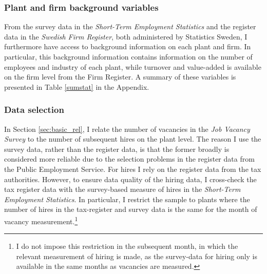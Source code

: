\subsubsection{Plant and firm background variables}

From the survey data in the \emph{Short-Term Employment Statistics} and the register data in the \emph{Swedish Firm Register}, both administered by Statistics Sweden, I furthermore have access to background information on each plant and firm. In particular, this background information contains information on the number of employees and industry of each plant, while turnover and value-added is available on the firm level from the Firm Register. A summary of these variables is presented in Table \ref{sumstat} in the Appendix. 

\subsubsection{Data selection}


In Section \ref{sec:basic_rel}, I relate the number of vacancies in the \textit{Job Vacancy Survey} to the number of subsequent hires on the plant level. The reason I use the survey data, rather than the register data, is that the former broadly is considered more reliable due to the selection problems in the register data from the Public Employment Service. For hires I rely on the register data from the tax authorities. However, to ensure data quality of the hiring data, I cross-check the tax register data with the survey-based measure of hires in the \emph{Short-Term Employment Statistics}. In particular, I restrict the sample to plants where the number of hires in the tax-register and survey data is the same for the month of vacancy measurement.\footnote{I do not impose this restriction in the subsequent month, in which the relevant measurement of hiring is made, as the survey-data for hiring only is available in the same months as vacancies are measured.} 

 
